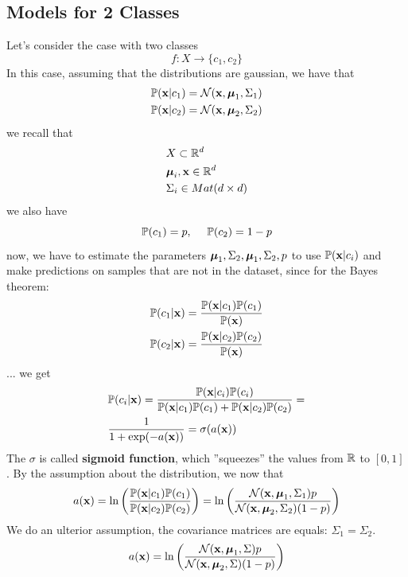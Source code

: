 \documentclass[10pt, letterpaper]{report}
\begin{document}
\subsection{Models for 2 Classes}
Let's consider the case with two classes
$$
	f:X\rightarrow\{c_1,c_2\}
$$
In this case, assuming that the distributions are gaussian, we have that
\begin{align}
	 & {\mathbb P}(\mathbf x|c_1)=\mathcal N(\mathbf x,{\boldsymbol{\mu}}_1,\Sigma_1) \\
	 & {\mathbb P}(\mathbf x|c_2)=\mathcal N(\mathbf x,{\boldsymbol{\mu}}_2,\Sigma_2)
\end{align}
we recall that
\begin{align}
	 & X\subset {\mathbb R}^d              \\
	 & {\boldsymbol{\mu}}_i,\mathbf x\in{\mathbb R}^d    \\
	 & \Sigma_i\in Mat(d\times d)
\end{align}
we also have
\begin{equation}
	{\mathbb P}(c_1)=p,  \ \ \ \ {\mathbb P}(c_2)=1-p
\end{equation}
now, we have to estimate the parameters ${\boldsymbol{\mu}}_1,\Sigma_2,{\boldsymbol{\mu}}_1,\Sigma_2,p$ to use ${\mathbb P}(\mathbf x|c_i)$ and make predictions on samples that are not in the dataset, since for the Bayes theorem:
\begin{align}
	 & {\mathbb P}(c_1|\mathbf x)=\frac{{\mathbb P}(\mathbf x|c_1){\mathbb P}(c_1)}{{\mathbb P}(\mathbf x)} \\
	 & {\mathbb P}(c_2|\mathbf x)=\frac{{\mathbb P}(\mathbf x|c_2){\mathbb P}(c_2)}{{\mathbb P}(\mathbf x)}
\end{align}
...
we get
\begin{align}
	 & {\mathbb P}(c_i|\mathbf x)=\frac{{\mathbb P}(\mathbf x|c_i){\mathbb P}(c_i)}{{\mathbb P}(\mathbf x|c_1){\mathbb P}(c_1)+{\mathbb P}(\mathbf x|c_2){\mathbb P}(c_2)}= \\
	 & \frac{1}{1+\exp(-a(\mathbf x))}=\sigma(a(\mathbf x))
\end{align}
The $\sigma$ is called \textbf{sigmoid function}, which ''squeezes'' the values from ${\mathbb R}$ to $[0,1]$. By the assumption about the distribution, we now that
\begin{equation}
	a(\mathbf x)=\ln\left(\frac{{\mathbb P}(\mathbf x|c_1){\mathbb P}(c_1)}{{\mathbb P}(\mathbf x|c_2){\mathbb P}(c_2)}\right)=
	\ln\left(\frac{\mathcal N(\mathbf x,{\boldsymbol{\mu}}_1,\Sigma_1)p}{\mathcal N(\mathbf x,{\boldsymbol{\mu}}_2,\Sigma_2)(1-p)}\right)
\end{equation}
We do an ulterior assumption, the covariance matrices are equals: $\Sigma_1=\Sigma_2$.
\begin{equation}
	a(\mathbf x)=
	\ln\left(\frac{\mathcal N(\mathbf x,{\boldsymbol{\mu}}_1,\Sigma)p}{\mathcal N(\mathbf x,{\boldsymbol{\mu}}_2,\Sigma)(1-p)}\right)
\end{equation}
\end{document}
